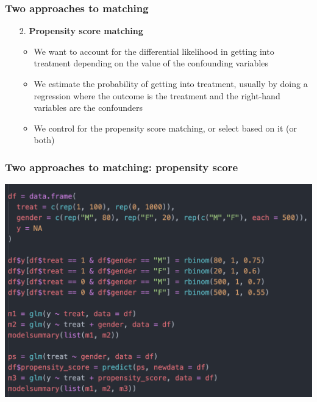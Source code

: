 \documentclass[aspectratio=43]{beamer}
\begin{document}
\begin{frame}
\frametitle{Two approaches to matching}
\centering

\begin{itemize}
  \item[2.] \textbf{Propensity score matching}
  \begin{itemize}
    \item We want to account for the differential likelihood in getting into treatment depending on the value of the confounding variables
    \item We estimate the probability of getting into treatment, usually by doing a regression where the outcome is the treatment and the right-hand variables are the confounders
    \item We control for the propensity score matching, or select based on it (or both)
  \end{itemize}
\end{itemize}


\end{frame}

\begin{frame}
\frametitle{Two approaches to matching: propensity score}
\centering

\includegraphics[width = \textwidth]{../img/propscore1}

\end{frame}
\end{document}
